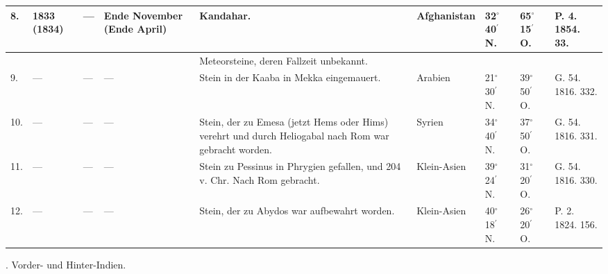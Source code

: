 \documentclass[a4paper, 8pt, oneside, polutonikogreek, german]{article}
\begin{document}
\begin{center}
\begin{longtable}{|p{3mm}|p{12mm}|p{5mm}|p{13mm}|p{25mm}|p{20mm}|p{13mm}|p{13mm}|p{13mm}|}
        8. & 1833 (1834) & --- & Ende November (Ende April) & Kandahar. & Afghanistan & 32$^\circ$ 40$^\prime$ N. & 65$^\circ$ 15$^\prime$ O. & P. 4. 1854. 33. \\ \hline
          &   &   &   & Meteorsteine, deren Fallzeit unbekannt. &   &   &   &   \\ \hline
        9. & --- & --- & --- & Stein in der Kaaba in Mekka eingemauert. & Arabien & 21$^\circ$ 30$^\prime$ N. & 39$^\circ$ 50$^\prime$ O. & G. 54. 1816. 332. \\ \hline
        10. & --- & --- & --- & Stein, der zu Emesa (jetzt Hems oder Hims) verehrt und durch Heliogabal nach Rom war gebracht worden. & Syrien & 34$^\circ$ 40$^\prime$ N. & 37$^\circ$ 50$^\prime$ O. & G. 54. 1816. 331. \\ \hline
        11. & --- & --- & --- & Stein zu Pessinus in Phrygien gefallen, und 204 v. Chr. Nach Rom gebracht. & Klein-Asien & 39$^\circ$ 24$^\prime$ N. & 31$^\circ$ 20$^\prime$ O. & G. 54. 1816. 330. \\ \hline
        12. & --- & --- & --- & Stein, der zu Abydos war aufbewahrt worden. & Klein-Asien & 40$^\circ$ 18$^\prime$ N. & 26$^\circ$ 20$^\prime$ O. & P. 2. 1824. 156. \\ \hline
    \end{longtable}
\end{center}
. Vorder- und Hinter-Indien.
\end{document}
